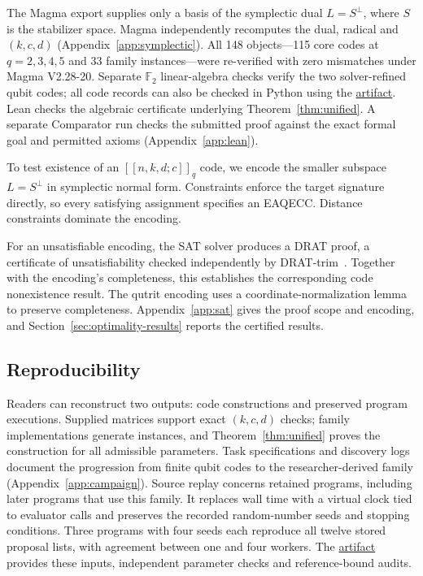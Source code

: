 \documentclass{article}
\newcommand{\F}{\mathbb{F}}
\newcommand{\artifactlink}{\href{https://github.com/LeGenAI/llm_guided_EAQECC_search/tree/arxiv-v1}{artifact}}
\begin{document}
The Magma export supplies only a basis of the symplectic dual
$L=S^\perp$, where $S$ is the stabilizer space. Magma independently
recomputes the dual, radical and $(k,c,d)$ (Appendix~\ref{app:symplectic}).
All 148 objects---115 core codes at $q=2,3,4,5$ and 33 family instances---were re-verified with zero mismatches under Magma V2.28-20.
Separate $\F_2$ linear-algebra checks verify the two solver-refined
qubit codes; all code records can also be checked in Python using the
\artifactlink{}. Lean checks the algebraic certificate underlying
Theorem~\ref{thm:unified}. A separate Comparator run checks the submitted
proof against the exact formal goal and permitted axioms
(Appendix~\ref{app:lean}).


To test existence of an $[[n,k,d;c]]_q$ code, we encode the smaller
subspace $L=S^\perp$ in symplectic normal form. Constraints enforce
the target signature directly, so every satisfying assignment specifies
an EAQECC. Distance constraints dominate the encoding.

For an unsatisfiable encoding, the SAT solver produces a DRAT proof,
a certificate of unsatisfiability checked independently by
DRAT-trim~\citep{DRATtrim}. Together with the encoding's completeness,
this establishes the corresponding code nonexistence result. The qutrit encoding uses a coordinate-normalization
lemma to preserve completeness. Appendix~\ref{app:sat} gives the proof
scope and encoding, and Section~\ref{sec:optimality-results} reports the
certified results.

\subsection{Reproducibility}\label{sec:repro}

Readers can reconstruct two outputs: code constructions and preserved
program executions. Supplied matrices support exact $(k,c,d)$ checks;
family implementations generate instances, and Theorem~\ref{thm:unified}
proves the construction for all admissible parameters. Task specifications
and discovery logs document the progression from finite qubit codes to
the researcher-derived family (Appendix~\ref{app:campaign}). Source replay
concerns retained programs, including later programs that use this family.
It replaces wall time with a virtual clock tied to evaluator calls and
preserves the recorded random-number seeds and stopping conditions.
Three programs with four seeds each reproduce all twelve stored proposal
lists, with agreement between one and four workers. The \artifactlink{}
provides these inputs, independent parameter checks and reference-bound
audits.
\end{document}
